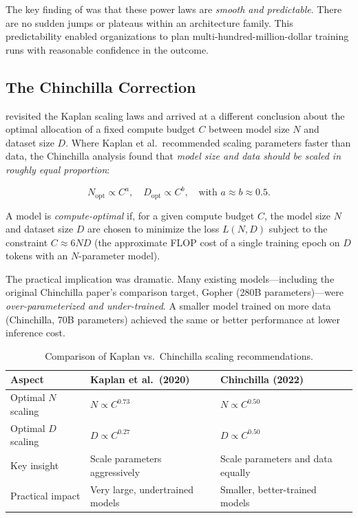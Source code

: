 The key finding of \citet{kaplan2020} was that these power laws are \emph{smooth and predictable}. There are no sudden jumps or plateaus within an architecture family. This predictability enabled organizations to plan multi-hundred-million-dollar training runs with reasonable confidence in the outcome.

\subsection{The Chinchilla Correction}

\citet{hoffmann2022} revisited the Kaplan scaling laws and arrived at a different conclusion about the optimal allocation of a fixed compute budget $C$ between model size $N$ and dataset size $D$. Where Kaplan et al.\ recommended scaling parameters faster than data, the Chinchilla analysis found that \emph{model size and data should be scaled in roughly equal proportion}:

\begin{equation}
N_{\text{opt}} \propto C^{a}, \quad D_{\text{opt}} \propto C^{b}, \quad \text{with } a \approx b \approx 0.5.
\label{eq:chinchilla}
\end{equation}

\begin{definition}
A model is \emph{compute-optimal} if, for a given compute budget $C$, the model size $N$ and dataset size $D$ are chosen to minimize the loss $L(N, D)$ subject to the constraint $C \approx 6ND$ (the approximate FLOP cost of a single training epoch on $D$ tokens with an $N$-parameter model).
\end{definition}

The practical implication was dramatic. Many existing models---including the original Chinchilla paper's comparison target, Gopher (280B parameters)---were \emph{over-parameterized and under-trained}. A smaller model trained on more data (Chinchilla, 70B parameters) achieved the same or better performance at lower inference cost.

\begin{table}[H]
\centering
\caption{Comparison of Kaplan vs.\ Chinchilla scaling recommendations.}
\label{tab:kaplan-chinchilla}
\renewcommand{\arraystretch}{1.15}
\begin{tabularx}{0.95\textwidth}{L{3.5cm} Y Y}
\toprule
\textbf{Aspect} & \textbf{Kaplan et al.\ (2020)} & \textbf{Chinchilla (2022)} \\
\midrule
Optimal $N$ scaling & $N \propto C^{0.73}$ & $N \propto C^{0.50}$ \\
Optimal $D$ scaling & $D \propto C^{0.27}$ & $D \propto C^{0.50}$ \\
Key insight & Scale parameters aggressively & Scale parameters and data equally \\
Practical impact & Very large, undertrained models & Smaller, better-trained models \\
\bottomrule
\end{tabularx}
\end{table}

